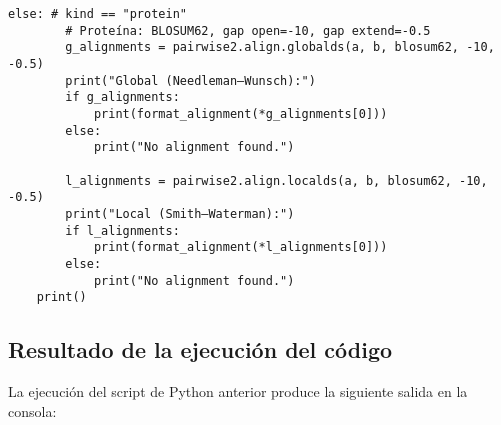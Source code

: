 \documentclass[fleqn,10pt]{article}
\begin{document}
\begin{lstlisting}[style=pythonstyle, caption={Código Python para alineamiento de secuencias con BioPython}, label={lst:biopython_code}]
    else: # kind == "protein"
        # Proteína: BLOSUM62, gap open=-10, gap extend=-0.5
        g_alignments = pairwise2.align.globalds(a, b, blosum62, -10, -0.5)
        print("Global (Needleman–Wunsch):")
        if g_alignments:
            print(format_alignment(*g_alignments[0]))
        else:
            print("No alignment found.")
            
        l_alignments = pairwise2.align.localds(a, b, blosum62, -10, -0.5)
        print("Local (Smith–Waterman):")
        if l_alignments:
            print(format_alignment(*l_alignments[0]))
        else:
            print("No alignment found.")
    print()
\end{lstlisting}

\subsection*{Resultado de la ejecución del código}
La ejecución del script de Python anterior produce la siguiente salida en la consola:
\end{document}
